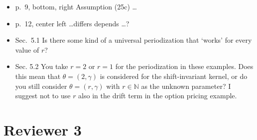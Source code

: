 \documentclass{amsart}
\begin{document}
\begin{itemize}
\item p.\ 9, bottom, right Assumption (25c) \ldots 

\item p.\ 12, center left  \ldots differs depends \ldots ?  

\item Sec.\ 5.1 Is there some kind of a universal periodization that ‘works’ for every value of $r$?

\item Sec. 5.2 You take $r = 2$ or $r = 1$ for the periodization in these examples. Does this mean that $\theta = (2,\gamma)$ is considered for the shift-invariant kernel, or do you still consider $\theta = (r,\gamma)$ with $r \in \mathbb{N}$ as the unknown parameter?
I suggest not to use $r$ also in the drift term in the option pricing example.

\end{itemize}

\section*{Reviewer 3}
\end{document}
